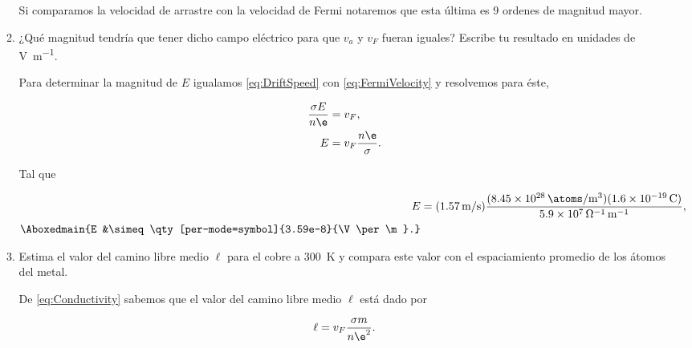 \documentclass[./../main.tex]{subfiles}
\begin{document}
\begin{exercise}
\begin{enumerate}
\begin{enumerate}[label = (b.\arabic*)]
\begin{solution}
                        Si comparamos la velocidad de arrastre con la velocidad de Fermi notaremos que esta última es 9 ordenes de magnitud mayor.
                    \end{solution}
                    
                    \color{blue}
                    \item ¿Qué magnitud tendría que tener dicho campo eléctrico para que \(v_{a}\) y \(v_{F}\) fueran iguales? Escribe tu resultado en unidades de \unit{\V\per\m}.
                    \color{black}
                    \begin{solution}
                        Para determinar la magnitud de \(E\) igualamos \cref{eq:DriftSpeed} con \cref{eq:FermiVelocity} y resolvemos para éste,

                        \begin{align*}
                            \dfrac{\sigma E}{n\e} &= v_{F},\\
                            E &= v_{F}\dfrac{n\e}{\sigma}.
                        \end{align*}
                        
                        Tal que

                        \begin{align*}
                            E &= (\qty[per-mode=symbol]{1.57}{\m\per\s})\dfrac{(\qty[per-mode=symbol]{8.45e28}{\atoms\per\m\cubed})(\qty{1.6e-19}{\C})}{\qty[per-mode=power]{5.9e7}{\per\ohm\per\m}},\\
                            \Aboxedmain{E &\simeq \qty[per-mode=symbol]{3.59e-8}{\V\per\m}.}
                        \end{align*}
                    \end{solution}
                    
                    \color{blue}
                    \item Estima el valor del camino libre medio \(\ell\) para el cobre a \qty{300}{\kelvin} y compara este valor con el espaciamiento promedio de los átomos del metal.
                    \color{black}
                    \begin{solution}
                        De \cref{eq:Conductivity} sabemos que el valor del camino libre medio \(\ell\) está dado por

                        \begin{equation*}
                            \ell = v_{F}\dfrac{\sigma m}{n\e^{2}}.
                        \end{equation*}


\end{solution}
\end{enumerate}
\end{enumerate}
\end{exercise}
\end{document}
